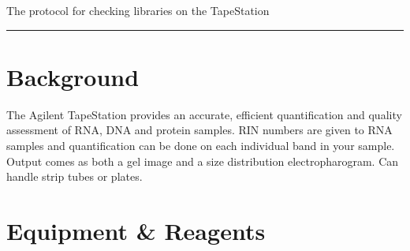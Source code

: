 \documentclass[
  letterpaper,
  DIV=11,
  numbers=noendperiod]{scrreprt}
\begin{document}
The protocol for checking libraries on the TapeStation

\begin{center}\rule{0.5\linewidth}{0.5pt}\end{center}

\hypertarget{background-2}{%
\section*{\texorpdfstring{\textbf{Background}}{Background}}\label{background-2}}


The Agilent TapeStation provides an accurate, efficient quantification
and quality assessment of RNA, DNA and protein samples. RIN numbers are
given to RNA samples and quantification can be done on each individual
band in your sample. Output comes as both a gel image and a size
distribution electropharogram. Can handle strip tubes or plates.

\hypertarget{equipment-reagents-1}{%
\section*{\texorpdfstring{\textbf{Equipment \&
Reagents}}{Equipment \& Reagents}}\label{equipment-reagents-1}}

\end{document}
